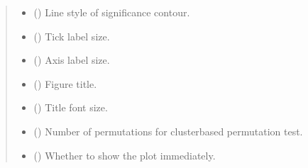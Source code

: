 \documentclass[letterpaper,10pt,english]{sphinxhowto}
\begin{document}
\begin{fulllineitems}
\begin{quote}
\begin{description}
\begin{itemize}
\item {} 
\sphinxAtStartPar
{} (\sphinxstyleliteralemphasis{\sphinxupquote{, }}) \textendash{} Line style of significance contour.

\item {} 
\sphinxAtStartPar
{} (\sphinxstyleliteralemphasis{\sphinxupquote{, }}) \textendash{} Tick label size.

\item {} 
\sphinxAtStartPar
{} (\sphinxstyleliteralemphasis{\sphinxupquote{, }}) \textendash{} Axis label size.

\item {} 
\sphinxAtStartPar
{} (\sphinxstyleliteralemphasis{\sphinxupquote{, }}) \textendash{} Figure title.

\item {} 
\sphinxAtStartPar
{} (\sphinxstyleliteralemphasis{\sphinxupquote{, }}) \textendash{} Title font size.

\item {} 
\sphinxAtStartPar
{} (\sphinxstyleliteralemphasis{\sphinxupquote{, }}) \textendash{} Number of permutations for cluster\sphinxhyphen{}based permutation test.

\item {} 
\sphinxAtStartPar
{} (\sphinxstyleliteralemphasis{\sphinxupquote{, }}) \textendash{} Whether to show the plot immediately.


\end{itemize}
\end{description}
\end{quote}
\end{fulllineitems}
\end{document}
